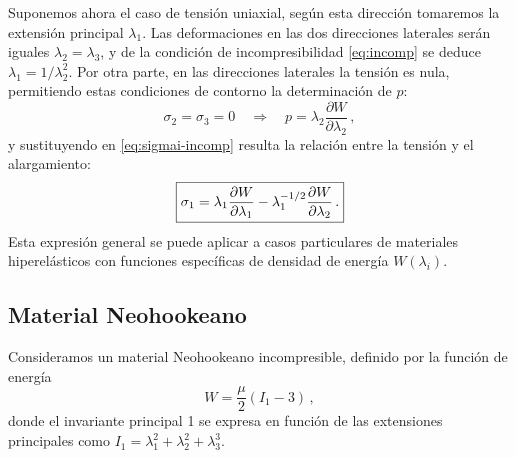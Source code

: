 Suponemos ahora el caso de tensión uniaxial, según esta dirección tomaremos la extensión principal $\lambda_1$. Las deformaciones en las dos direcciones laterales serán iguales $\lambda_2=\lambda_3$, y de la condición de incompresibilidad \eqref{eq:incomp} se deduce $\lambda_1 = 1/\lambda_2^2$. 
Por otra parte, en las direcciones laterales la tensión es nula, permitiendo estas condiciones de contorno la determinación de $p$:
\begin{equation}
  \sigma_2 = \sigma_3 = 0 
  \quad\Rightarrow\quad 
  p=\lambda_2\frac{\partial W}{\partial\lambda_2}
  \,,
\end{equation}
y sustituyendo en 
\eqref{eq:sigmai-incomp} 
resulta la relación entre la tensión y el alargamiento:
\begin{equation}
	\fbox{$\displaystyle 
  \sigma_1 = \lambda_1\frac{\partial W}{\partial\lambda_1} - 
  \lambda_1^{-1/2}\frac{\partial W}{\partial\lambda_2}
  \,.
  $}
  \label{eq:tuni}
\end{equation}
Esta expresión general se puede aplicar a casos particulares de materiales hiperelásticos con funciones específicas de densidad de energía $W(\lambda_{i})$.

\subsection{Material Neohookeano}
Consideramos un material Neohookeano incompresible, definido por la función de energía
\begin{equation}
  W = \frac{\mu}{2}\left(I_1-3\right)
  \,,
  \label{eq:neoh}
\end{equation}
donde el invariante principal 1 se expresa en función de las extensiones principales como
$I_1=\lambda_1^2+\lambda_2^2+\lambda_3^3$.

